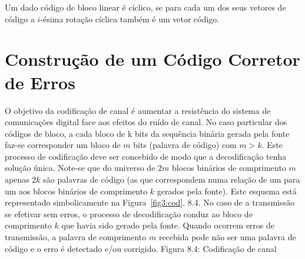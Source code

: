 \begin{definition} Um dado código de bloco linear é cíclico, se para cada um dos seus vetores de código a $i$-ésima rotação cíclica também é um vetor código.
\end{definition}


\section{Construção de um Código Corretor de Erros}




O objetivo da codificação de canal é aumentar a resistência do sistema de comunicações digital face aos efeitos do ruído de canal. No caso particular dos códigos de bloco, a cada bloco de k bits da sequência binária gerada pela fonte faz-se corresponder um bloco de $m$ bits (palavra de código) com $m > k$. Este processo de codificação deve ser concebido de modo que a decodificação tenha solução única. Note-se que do universo de $2m$ blocos binários de comprimento $m$ apenas $2k$ são palavras de código (as que correspondem numa relação de um para um aos blocos binários de comprimento $k$ gerados pela fonte). Este esquema está representado simbolicamente na Figura~\ref{fig3:cod}. 8.4. No caso de a transmissão se efetivar sem erros, o processo de decodificação conduz ao bloco de comprimento $k$ que havia sido gerado pela fonte. Quando ocorrem erros de transmissão, a palavra de comprimento $m$ recebida pode não ser uma palavra de código e o erro é detectado e/ou corrigido.
Figura 8.4: Codificação de canal

